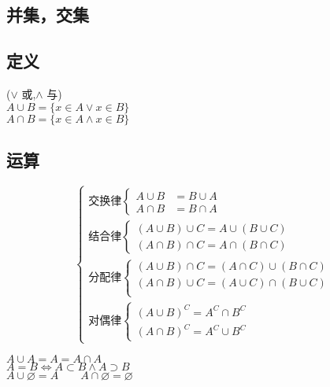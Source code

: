 \begin{center}\section{ 并集，交集}\end{center}
\subsection{定义}
\begin{center}
    (\(\vee\) 或,\(\land\) 与) \\
$A\cup B=\{x\in A\vee x\in B\}$ \\
$A\cap B=\{x\in A\land x\in B\}$
\end{center}
\subsection{运算}
$$\begin{cases}
    \mbox{交换律} \begin{cases}
        A\cup B&= B\cup A  \\
        A\cap B&= B\cap A
    \end{cases} \\
    \mbox{结合律}\begin{cases}
        (A\cup B)\cup C = A\cup(B\cup C) \\
        (A\cap B)\cap C = A\cap(B\cap C)
    \end{cases} \\
    \mbox{分配律}\begin{cases}
        (A\cup B)\cap C = (A\cap C)\cup (B \cap C) \\
        (A\cap B)\cup C = (A\cup C)\cap (B \cup C) \\
    \end{cases}\\
    \mbox{对偶律}\begin{cases}
        (A\cup B)^C = A^C\cap B^C \\
        (A\cap B)^C = A^C\cup B^C
    \end{cases}
\end{cases}$$
\begin{center}
    $A\cup A= A = A\cap A $\\
    $A = B \Leftrightarrow A\subset B\land A\supset B$  \\
    $A\cup\varnothing = A {\qquad}A\cap\varnothing = \varnothing $
\end{center}
